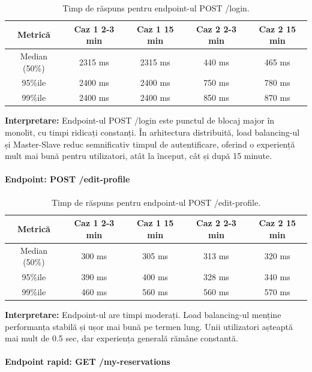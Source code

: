 \documentclass[12pt, a4paper, oneside, romanian]{teza-upb}
\begin{document}
\begin{table}[h!]
\centering
\begin{tabular}{c|c|c|c|c}
\hline
Metrică & Caz 1 2-3 min & Caz 1 15 min & Caz 2 2-3 min & Caz 2 15 min \\
\hline
Median (50\%) & 2315 ms & 2315 ms & 440 ms & 465 ms \\
95\%ile & 2400 ms & 2400 ms & 750 ms & 780 ms \\
99\%ile & 2400 ms & 2400 ms & 850 ms & 870 ms \\
\hline
\end{tabular}
\caption{Timp de răspuns pentru endpoint-ul POST /login.}
\label{tab:login-comp-full}
\end{table}

\textbf{Interpretare:} Endpoint-ul POST /login este punctul de blocaj major în monolit, cu timpi ridicați constanți. În arhitectura distribuită, load balancing-ul și Master-Slave reduc semnificativ timpul de autentificare, oferind o experiență mult mai bună pentru utilizatori, atât la început, cât și după 15 minute.

\paragraph{Endpoint: POST /edit-profile}

\begin{table}[h!]
\centering
\begin{tabular}{c|c|c|c|c}
\hline
Metrică & Caz 1 2-3 min & Caz 1 15 min & Caz 2 2-3 min & Caz 2 15 min \\
\hline
Median (50\%) & 300 ms & 305 ms & 313 ms & 320 ms \\
95\%ile & 390 ms & 400 ms & 328 ms & 340 ms \\
99\%ile & 460 ms & 560 ms & 560 ms & 570 ms \\
\hline
\end{tabular}
\caption{Timp de răspuns pentru endpoint-ul POST /edit-profile.}
\label{tab:edit-profile-comp-full}
\end{table}

\textbf{Interpretare:} Endpoint-ul are timpi moderați. Load balancing-ul menține performanța stabilă și ușor mai bună pe termen lung. Unii utilizatori așteaptă mai mult de 0.5 sec, dar experiența generală rămâne constantă.

\paragraph{Endpoint rapid: GET /my-reservations}
\end{document}
